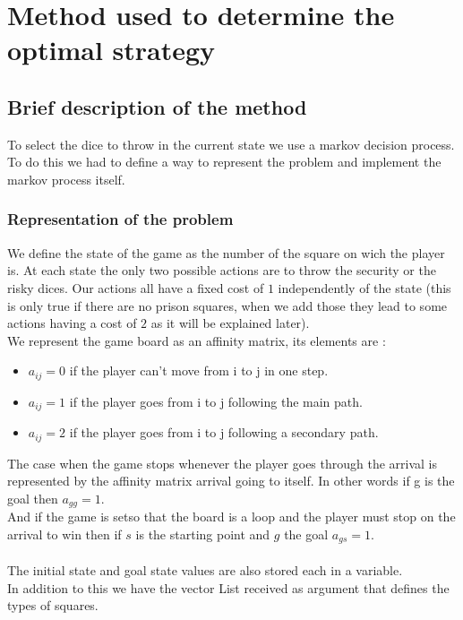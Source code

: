 \documentclass{eplDoc}
\begin{document}
\maketitle
\newpage

\section{Method used to determine the optimal strategy}

\subsection{Brief description of the method}
To select the dice to throw in the current state we use a markov decision process. To do this we had to define a way to represent the problem and implement the markov process itself. 

\subsubsection{Representation of the problem}
We define the state of the game as the number of the square on wich the player is. At each state the only two possible actions are to throw the security or the risky dices. Our actions all have a fixed cost of $1$ independently of the state (this is only true if there are no prison squares, when we add those they lead to some actions having a cost of $2$ as it will be explained later). \\ 
We represent the game board as an affinity matrix, its elements are : 
\begin{itemize}
	\item $a_{ij}=0$ if the player can't move from i to j in one step.
	\item $a_{ij}=1$ if the player goes from i to j following the main path.
	\item $a_{ij}=2$ if the player goes from i to j following a secondary path.
\end{itemize}
The case when the game stops whenever the player goes through the arrival is represented by the affinity matrix arrival going to itself. In other words if g is the goal then $a_{gg} = 1$. \\ 
And if the game is setso that the board is a loop and the player must stop on the arrival to win then if $s$ is the starting point and $g$ the goal $a_{gs} = 1$. \\ \\ 

The initial state and goal state values are also stored each in a variable. \\ 
In addition to this we have the vector List received as argument that defines the types of squares. \\ 
\end{document}

